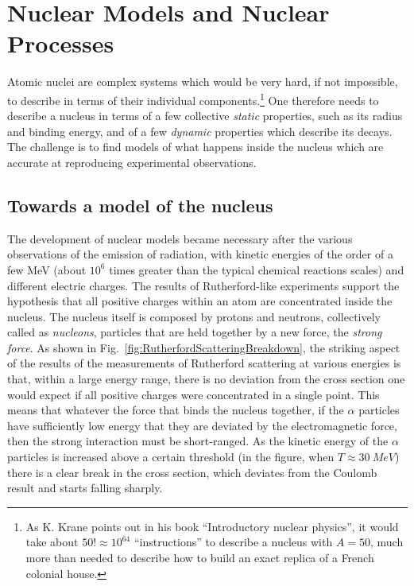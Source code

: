 \chapter{Nuclear Models and Nuclear Processes}
\label{chapter-nuclear-physics}

Atomic nuclei are complex systems which would be very hard, if not impossible, to describe in terms of their individual components.\footnote{As K. Krane points out in his book ``Introductory nuclear physics'', it would take about \(50!\approx10^{64}\) ``instructions'' to describe a nucleus with \(A=50\), much more than needed to describe how to build an exact replica of a French colonial house.} One therefore needs to describe a nucleus in terms of a few collective \emph{static} properties, such as its radius and binding energy, and of a few \emph{dynamic} properties which describe its decays. The challenge is to find models of what happens inside the nucleus which are accurate at reproducing experimental observations.

\section{Towards a model of the nucleus}
The development of nuclear models became necessary after the various observations of the emission of radiation, with kinetic energies of the order of a few \si{MeV} (about $10^6$ times greater than the typical chemical reactions scales) and different electric charges. 
The results of Rutherford-like experiments support the hypothesis that all positive charges within an atom are concentrated inside the nucleus. The nucleus itself is composed by protons and neutrons, collectively called as \emph{nucleons}, particles that are held together by a new force, the \emph{strong force}.
As shown in Fig.~\ref{fig:RutherfordScatteringBreakdown}, the striking aspect of the results of the measurements of Rutherford scattering at various energies is that, within a large energy range, there is no deviation from the cross section one would expect if all positive charges were concentrated in a single point. This means that whatever the force that binds the nucleus together, if the $\alpha$ particles have sufficiently low energy that they are deviated by the electromagnetic force, then the strong interaction must be short-ranged. 
As the kinetic energy of the $\alpha$ particles is increased above a certain threshold (in the figure, when \(T\approx\SI{30}{MeV}\)) there is a clear break in the cross section, which deviates from the Coulomb result and starts falling sharply.

